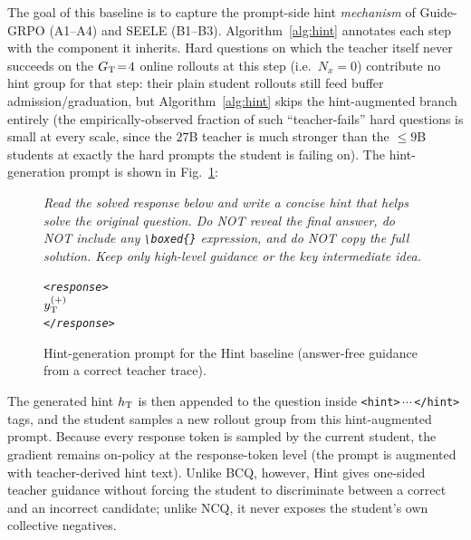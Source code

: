 The goal of this baseline is to capture the prompt-side hint \emph{mechanism} of Guide-GRPO (A1--A4) and SEELE (B1--B3). Algorithm~\ref{alg:hint} annotates each step with the component it inherits. Hard questions on which the teacher itself never succeeds on the $G_{\rm T}\!=\!4$ online rollouts at this step (i.e.\ $N_x\!=\!0$) contribute no hint group for that step: their plain student rollouts still feed buffer admission/graduation, but Algorithm~\ref{alg:hint} skips the hint-augmented branch entirely (the empirically-observed fraction of such ``teacher-fails'' hard questions is small at every scale, since the $27$B teacher is much stronger than the $\leq\!9$B students at exactly the hard prompts the student is failing on). The hint-generation prompt is shown in Fig.~\ref{fig:prompt-hint}:
\begin{figure}[!htbp]
\begin{prompttemplatefig}
\small
\emph{Read the solved response below and write a concise hint that helps solve the original question. Do NOT reveal the final answer, do NOT include any \texttt{\textbackslash boxed\{\}} expression, and do NOT copy the full solution. Keep only high-level guidance or the key intermediate idea.}

\emph{\texttt{<response>}\\
$y_{\rm T}^{(+)}$\\
\texttt{</response>}}
\end{prompttemplatefig}
\caption{Hint-generation prompt for the Hint baseline (answer-free guidance from a correct teacher trace).}
\label{fig:prompt-hint}
\end{figure}
The generated hint $h_{\rm T}$ is then appended to the question inside \texttt{<hint>}\,$\cdots$\,\texttt{</hint>} tags, and the student samples a new rollout group from this hint-augmented prompt. Because every response token is sampled by the current student, the gradient remains on-policy at the response-token level (the prompt is augmented with teacher-derived hint text). Unlike BCQ, however, Hint gives one-sided teacher guidance without forcing the student to discriminate between a correct and an incorrect candidate; unlike NCQ, it never exposes the student's own collective negatives.
